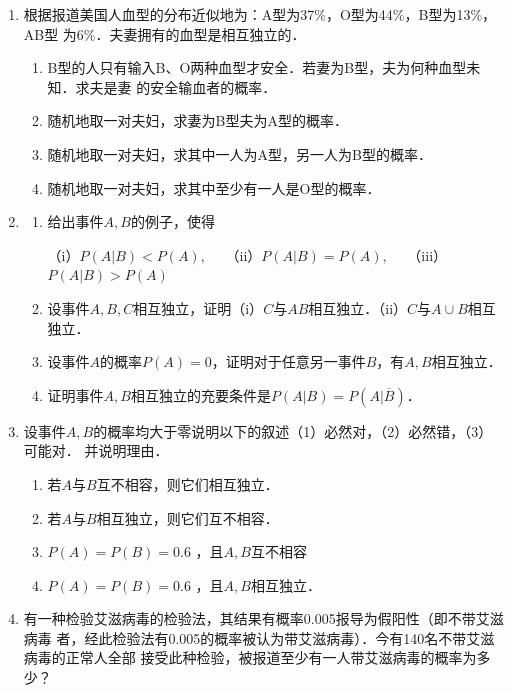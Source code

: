\begin{enumerate}
    \item 根据报道美国人血型的分布近似地为：A型为37\%，O型为44\%，B型为13\%，AB型
    为6\%．夫妻拥有的血型是相互独立的．
    \begin{enumerate}
        \item B型的人只有输入B、O两种血型才安全．若妻为B型，夫为何种血型未知．求夫是妻
        的安全输血者的概率．
        \item 随机地取一对夫妇，求妻为B型夫为A型的概率．
        \item 随机地取一对夫妇，求其中一人为A型，另一人为B型的概率．
        \item 随机地取一对夫妇，求其中至少有一人是O型的概率．
    \end{enumerate}



    \item \begin{enumerate}
        \item 给出事件$A,B$的例子，使得
        

        （i）$P(A|B)<P(A),\quad$ （ii）$P(A|B)=P(A),\quad$ （iii）$P(A|B)>P(A)$
        \item 设事件$A,B,C$相互独立，证明（i）$C$与$AB$相互独立．（ii）$C$与$A\cup B$相互独立．
        \item 设事件$A$的概率$P(A)=0$，证明对于任意另一事件$B$，有$A,B$相互独立．
        \item 证明事件$A,B$相互独立的充要条件是$P(A|B)=P(A|\overline{B})$．
    \end{enumerate}



    \item 设事件$A,B$的概率均大于零说明以下的叙述（1）必然对，（2）必然错，（3）可能对．
    并说明理由．
    \begin{enumerate}
        \item 若$A$与$B$互不相容，则它们相互独立．
        \item 若$A$与$B$相互独立，则它们互不相容．
        \item $P(A)=P(B)=0.6$ ，且$A,B$互不相容
        \item $P(A)=P(B)=0.6$ ，且$A,B$相互独立．
    \end{enumerate}


    \item 有一种检验艾滋病毒的检验法，其结果有概率0.005报导为假阳性（即不带艾滋病毒
    者，经此检验法有0.005的概率被认为带艾滋病毒）．今有140名不带艾滋病毒的正常人全部
    接受此种检验，被报道至少有一人带艾滋病毒的概率为多少？




\end{enumerate}
